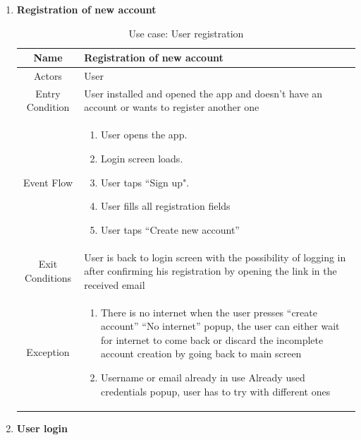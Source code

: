 \begin{enumerate}
	
\item \textbf{Registration of new account}

\begin{table}[H]
{
\begin{tabular}{|c|p{14cm}|}
	\hline
	Name & Registration of new account\\
	\hline
	Actors & User\\
	\hline
	Entry Condition & User installed and opened the app and doesn’t have an account or wants to register another one\\
	\hline
	Event Flow & \begin{enumerate}
		\item User opens the app.
		\item Login screen loads.
		\item User taps “Sign up".
		\item User fills all registration fields
		\item User taps “Create new account”
		
		\end{enumerate}\\
	\hline
	Exit Conditions & User is back to login screen with the possibility of logging in after confirming his registration by opening the link in the received email	\\
	\hline
	Exception & \begin{enumerate}
		\item There is no internet when the user presses “create account”\newline
	“No internet” popup, the user can either wait for internet to come back or discard the incomplete account creation by going back to main screen
	\item Username or email already in use\newline
	Already used credentials popup, user has to try with different ones
\end{enumerate}\\
	\hline
\end{tabular}
}
	\label{tab:UCRegister}
	\caption{Use case: User registration}
\end{table}

\item \textbf{User login}
	

\end{enumerate}
